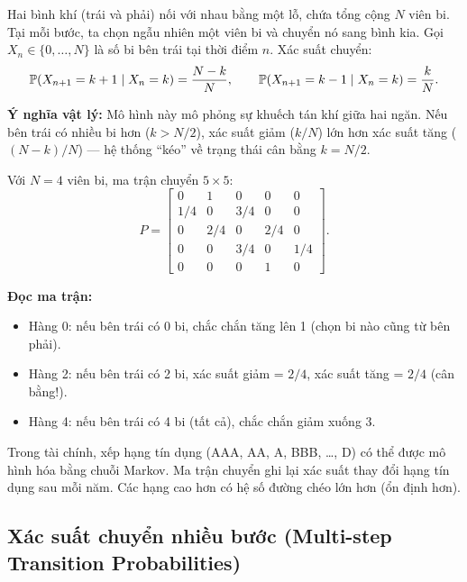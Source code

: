 \begin{example}
\label{ex:ehrenfest}
Hai bình khí (trái và phải) nối với nhau bằng một lỗ, chứa tổng cộng $N$ viên bi.
Tại mỗi bước, ta chọn ngẫu nhiên một viên bi và chuyển nó sang bình kia.
Gọi $X_n \in \{0,\ldots,N\}$ là số bi bên trái tại thời điểm $n$.
Xác suất chuyển:
\[
  \mathbb{P}(X_{n+1} = k+1 \mid X_n = k) = \frac{N-k}{N}, \qquad
  \mathbb{P}(X_{n+1} = k-1 \mid X_n = k) = \frac{k}{N}.
\]

\textbf{Ý nghĩa vật lý:} Mô hình này mô phỏng sự khuếch tán khí giữa hai ngăn.
Nếu bên trái có nhiều bi hơn ($k > N/2$), xác suất giảm ($k/N$) lớn hơn xác suất tăng ($(N-k)/N$)
--- hệ thống ``kéo'' về trạng thái cân bằng $k = N/2$.
\end{example}

\begin{example}[Ehrenfest $N = 4$ -- ma trận cụ thể]
\label{ex:ehrenfest-N4}
Với $N = 4$ viên bi, ma trận chuyển $5 \times 5$:
\[
  P = \begin{bmatrix}
    0 & 1 & 0 & 0 & 0 \\
    1/4 & 0 & 3/4 & 0 & 0 \\
    0 & 2/4 & 0 & 2/4 & 0 \\
    0 & 0 & 3/4 & 0 & 1/4 \\
    0 & 0 & 0 & 1 & 0
  \end{bmatrix}.
\]

\textbf{Đọc ma trận:}
\begin{itemize}[nosep]
  \item Hàng 0: nếu bên trái có 0 bi, chắc chắn tăng lên 1 (chọn bi nào cũng từ bên phải).
  \item Hàng 2: nếu bên trái có 2 bi, xác suất giảm = $2/4$, xác suất tăng = $2/4$ (cân bằng!).
  \item Hàng 4: nếu bên trái có 4 bi (tất cả), chắc chắn giảm xuống 3.
\end{itemize}
\end{example}

\begin{example}
Trong tài chính, xếp hạng tín dụng (AAA, AA, A, BBB, \ldots, D) có thể được mô hình hóa
bằng chuỗi Markov. Ma trận chuyển ghi lại xác suất thay đổi hạng tín dụng sau mỗi năm.
Các hạng cao hơn có hệ số đường chéo lớn hơn (ổn định hơn).
\end{example}

\subsection{Xác suất chuyển nhiều bước (Multi-step Transition Probabilities)}

